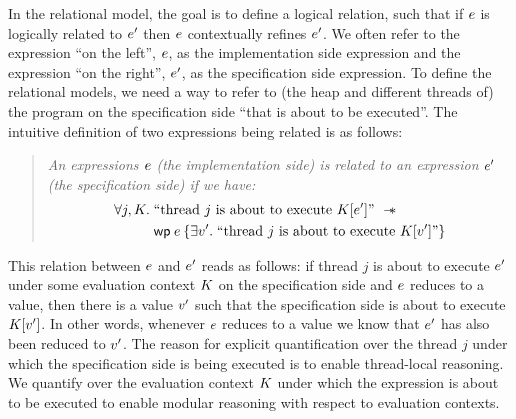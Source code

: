 In the relational model, the goal is to define a logical relation, such that if $e$ is logically related to $e'$ then $e$ contextually refines $e'$.
We often refer to the expression ``on the left'', $e$, as the implementation side expression and the expression ``on the right'', $e'$, as the specification side expression. 
To define the relational models, we need a way to 
refer to (the heap and different threads of) the program on the
specification side ``that is about to be executed''. The intuitive
definition of two expressions being related is as follows:
\begin{quote}
  \emph{
  An expressions $e$ (the
  implementation side) is related to an expression $e'$ (the
  specification side) if we have:
  \begin{align*}
    \forall j, \lctx.\;
    & \text{``thread $j$ is about to execute $\lctx[\expr']$''}~ \wand\\
    & \wpre{\expr}{\exists \val'.\; \text{``thread $j$
      is about to execute $\lctx[\val']$''}}
  \end{align*}
}
\end{quote}
%
This relation between $e$ and $e'$ reads as follows: if thread
$j$ is about to execute $e'$ under some evaluation context $K$
on the specification side and $e$ reduces to a value, then there
is a value $v'$ such that the specification side is about to
execute $K[v']$. In other words, whenever $e$ reduces to a
value we know that $e'$ has also been reduced to $v'$. The
reason for explicit quantification over the thread $j$ under which the
specification side is being executed is to enable thread-local
reasoning. We quantify over the evaluation context $K$ under which
the expression is about to be executed to enable modular reasoning
with respect to evaluation contexts.



